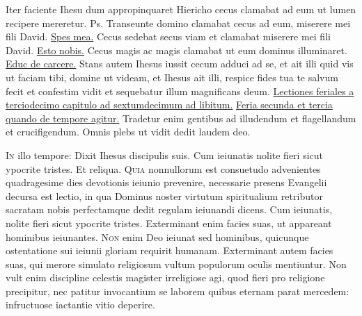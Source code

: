 \begin{multicols*}{2}
 Iter faciente Ihesu dum appropinquaret Hiericho cecus clamabat ad eum ut lumen recipere mereretur. {\color{Red} Ps.} 
 Transeunte domino clamabat cecus ad eum, miserere mei fili David. \R \hyperlink{spes-mea}{Spes mea.}
 Cecus sedebat secus viam et clamabat miserere mei fili David. \R \hyperlink{esto-nobis}{Esto nobis.}
 Cecus magis ac magis clamabat ut eum dominus illuminaret. \R \hyperlink{educ-de-carcere}{Educ de carcere.}
 Stans autem Ihesus iussit cecum adduci ad se, et ait illi quid vis ut faciam tibi, domine ut videam, et Ihesus ait illi, respice fides tua te salvum fecit et confestim vidit et sequebatur illum magnificans deum.
\newline \ul{Lectiones feriales a terciodecimo capitulo ad sextumdecimum ad libitum.}
\newline \ul{Feria secunda et tercia quando de tempore agitur.}
 Tradetur enim gentibus ad illudendum et flagellandum et crucifigendum.
 Omnis plebs ut vidit dedit laudem deo.
{\color{Red} }
\par {}
\lettrine[lines=2]{\zallmancaps \color{Red} I}{n} illo tempore: Dixit Ihesus discipulis suis. Cum ieiunatis nolite fieri sicut ypocrite tristes. Et reliqua.
\lettrine[lines=2]{\zallmancaps \color{Blue} Q}{uia} nonnullorum est consuetudo advenientes quadragesime dies devotionis ieiunio prevenire, necessarie presens Evangelii decursa est lectio, in qua Dominus noster virtutum spiritualium retributor sacratam nobis perfectamque dedit regulam ieiunandi dicens. Cum ieiunatis, nolite fieri sicut ypocrite tristes. Exterminant enim facies suas, ut appareant hominibus ieiunantes.
\lettrine[lines=2]{\zallmancaps \color{Red} N}{on} enim Deo ieiunat sed hominibus, quicunque ostentatione sui ieiunii gloriam requirit humanam. Exterminant autem facies suas, qui merore simulato religiosum vultum populorum oculis mentiuntur. Non vult enim discipline celestis magister irreligiose agi, quod fieri pro religione precipitur, nec patitur invocantium se laborem quibus eternam parat mercedem: infructuose iactantie vitio deperire.

\end{multicols*}
